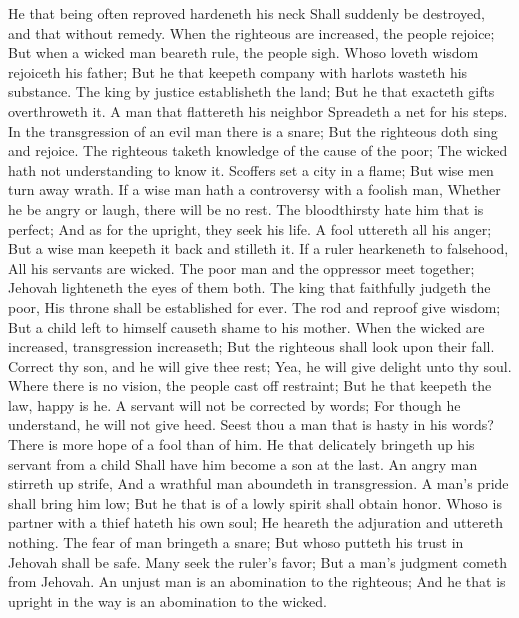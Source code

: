 He that being often reproved hardeneth his neck Shall suddenly be destroyed, and that without remedy.  When the righteous are increased, the people rejoice; But when a wicked man beareth rule, the people sigh.  Whoso loveth wisdom rejoiceth his father; But he that keepeth company with harlots wasteth his substance.  The king by justice establisheth the land; But he that exacteth gifts overthroweth it.  A man that flattereth his neighbor Spreadeth a net for his steps.  In the transgression of an evil man there is a snare; But the righteous doth sing and rejoice.  The righteous taketh knowledge of the cause of the poor; The wicked hath not understanding to know it.  Scoffers set a city in a flame; But wise men turn away wrath.  If a wise man hath a controversy with a foolish man, Whether he be angry or laugh, there will be no rest.  The bloodthirsty hate him that is perfect; And as for the upright, they seek his life.  A fool uttereth all his anger; But a wise man keepeth it back and stilleth it.  If a ruler hearkeneth to falsehood, All his servants are wicked.  The poor man and the oppressor meet together; Jehovah lighteneth the eyes of them both.  The king that faithfully judgeth the poor, His throne shall be established for ever.  The rod and reproof give wisdom; But a child left to himself causeth shame to his mother.  When the wicked are increased, transgression increaseth; But the righteous shall look upon their fall.  Correct thy son, and he will give thee rest; Yea, he will give delight unto thy soul.  Where there is no vision, the people cast off restraint; But he that keepeth the law, happy is he.  A servant will not be corrected by words; For though he understand, he will not give heed.  Seest thou a man that is hasty in his words? There is more hope of a fool than of him.  He that delicately bringeth up his servant from a child Shall have him become a son at the last.  An angry man stirreth up strife, And a wrathful man aboundeth in transgression.  A man’s pride shall bring him low; But he that is of a lowly spirit shall obtain honor.  Whoso is partner with a thief hateth his own soul; He heareth the adjuration and uttereth nothing.  The fear of man bringeth a snare; But whoso putteth his trust in Jehovah shall be safe.  Many seek the ruler’s favor; But a man’s judgment cometh from Jehovah.  An unjust man is an abomination to the righteous; And he that is upright in the way is an abomination to the wicked. 

